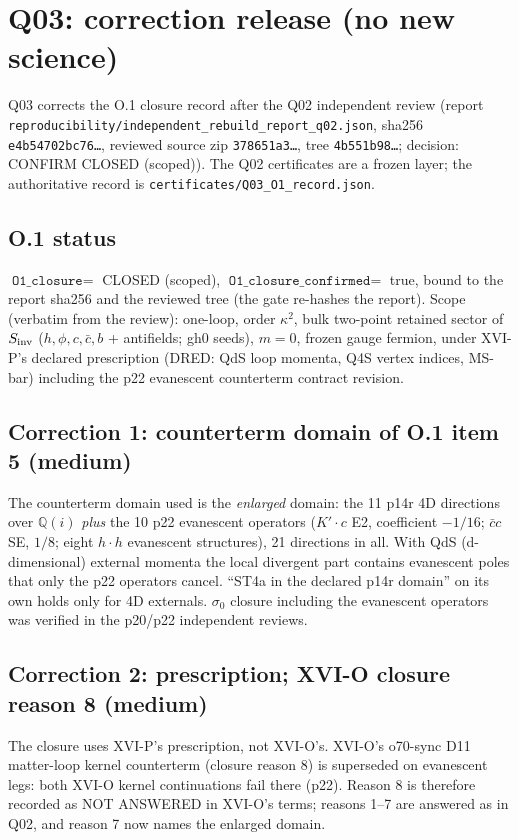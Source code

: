 \section{Q03: correction release (no new science)}
Q03 corrects the O.1 closure record after the Q02 independent review (report
\texttt{reproducibility/independent\_rebuild\_report\_q02.json}, sha256 \texttt{e4b54702bc76\ldots}, reviewed
source zip \texttt{378651a3\ldots}, tree \texttt{4b551b98\ldots}; decision: CONFIRM CLOSED (scoped)).
The Q02 certificates are a frozen layer; the authoritative record is \texttt{certificates/Q03\_O1\_record.json}.

\subsection{O.1 status}
$\texttt{O1\_closure} = $ CLOSED (scoped), $\texttt{O1\_closure\_confirmed} = $ true, bound to the report sha256 and the
reviewed tree (the gate re-hashes the report). Scope (verbatim from the review): one-loop, order $\kappa^2$, bulk
two-point retained sector of $S_{\rm inv}$ ($h,\phi,c,\bar c,b$ + antifields; gh0 seeds), $m=0$, frozen gauge
fermion, under XVI-P's declared prescription (DRED: QdS loop momenta, Q4S vertex indices, MS-bar) including the p22
evanescent counterterm contract revision.

\subsection{Correction 1: counterterm domain of O.1 item 5 (medium)}
The counterterm domain used is the \emph{enlarged} domain: the 11 p14r 4D directions over $\mathbb{Q}(i)$
\emph{plus} the 10 p22 evanescent operators ($K'\!\cdot c$ E2, coefficient $-1/16$; $\bar c c$ SE, $1/8$; eight
$h\!\cdot\!h$ evanescent structures), 21 directions in all. With QdS (d-dimensional) external momenta the local divergent part contains
evanescent poles that only the p22 operators cancel. ``ST4a in the declared p14r domain'' on its own holds only for 4D
externals. $\sigma_0$ closure including the evanescent operators was verified in the p20/p22 independent reviews.

\subsection{Correction 2: prescription; XVI-O closure reason 8 (medium)}
The closure uses XVI-P's prescription, not XVI-O's. XVI-O's o70-sync D11 matter-loop kernel counterterm (closure
reason 8) is superseded on evanescent legs: both XVI-O kernel continuations fail there (p22). Reason 8 is therefore
recorded as NOT ANSWERED in XVI-O's terms; reasons 1--7 are answered as in Q02, and reason 7 now names the enlarged domain.

